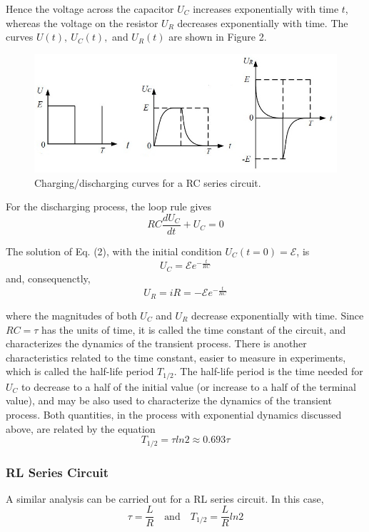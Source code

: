 \documentclass{article}
\begin{document}
Hence the voltage across the capacitor $ U_C $ increases exponentially with time $ t $, whereas the voltage on the resistor $ U_R $ decreases exponentially with time. The curves $ U(t),\ U_C(t), $ and $ U_R(t) $ are shown in Figure 2.

\begin{figure}[H]
	\centering
	\includegraphics[scale=0.6]{fig2.jpg}
	\caption{Charging/discharging curves for a RC series circuit.}
\end{figure}

For the discharging process, the loop rule gives
\begin{equation}
	 RC\dfrac{dU_C}{dt}+U_C=0
\end{equation} 

The solution of Eq. (2), with the initial condition $ U_C(t = 0) = \mathcal{E} $, is
$$ U_C=\mathcal{E}e^{-\frac{t}{RC}} $$
and, consequenctly,
$$ U_R=iR=-\mathcal{E}e^{-\frac{t}{RC}} $$

where the magnitudes of both $ U_C $ and $ U_R $ decrease exponentially with time. Since $ RC =\tau $ has the units of time, it is called the time constant of the circuit, and characterizes the dynamics of the transient process. There is another characteristics related to the time constant, easier to measure in experiments, which is called the half-life period $ T_{1/2} $. The half-life period is the time needed for $ U_C $ to decrease to a half of the initial value (or increase to a half of the terminal value), and may be also used to characterize the dynamics of the transient process. Both quantities, in the process with exponential dynamics discussed above, are related by the equation
$$ T_{1/2}=\tau ln2\approx0.693\tau $$

\subsubsection{RL Series Circuit}
A similar analysis can be carried out for a RL series circuit. In this case,
$$ \tau=\dfrac{L}{R}\quad\text{and}\quad T_{1/2}=\dfrac{L}{R}ln2 $$
\end{document}
